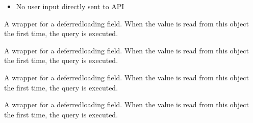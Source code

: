 \documentclass[letterpaper,10pt,french]{sphinxmanual}
\begin{document}
\begin{fulllineitems}
\begin{description}
\begin{itemize}
\item {} 
\sphinxAtStartPar
No user input directly sent to API

\end{itemize}

\end{description}

\begin{fulllineitems}
\label{\detokenize{index:bookings.models.MobileHome.name}}
\pysigstartsignatures
\pysigline
{}
\pysigstopsignatures
\sphinxAtStartPar
A wrapper for a deferred\sphinxhyphen{}loading field. When the value is read from this
object the first time, the query is executed.

\end{fulllineitems}


\begin{fulllineitems}
\label{\detokenize{index:bookings.models.MobileHome.name_en}}
\pysigstartsignatures
\pysigline
{}
\pysigstopsignatures
\sphinxAtStartPar
A wrapper for a deferred\sphinxhyphen{}loading field. When the value is read from this
object the first time, the query is executed.

\end{fulllineitems}


\begin{fulllineitems}
\label{\detokenize{index:bookings.models.MobileHome.name_es}}
\pysigstartsignatures
\pysigline
{}
\pysigstopsignatures
\sphinxAtStartPar
A wrapper for a deferred\sphinxhyphen{}loading field. When the value is read from this
object the first time, the query is executed.

\end{fulllineitems}


\begin{fulllineitems}
\label{\detokenize{index:bookings.models.MobileHome.name_de}}
\pysigstartsignatures
\pysigline
{}
\pysigstopsignatures
\sphinxAtStartPar
A wrapper for a deferred\sphinxhyphen{}loading field. When the value is read from this
object the first time, the query is executed.


\end{fulllineitems}
\end{fulllineitems}
\end{document}
